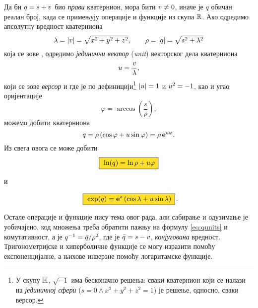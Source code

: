 Да би $q=s+{v}$ био {\sl прави\/} кватернион, мора бити ${v}\ne0$, иначе је $q$ обичан реалан број,
када се примењују операције и функције из скупа ${\mathbb R}$.
Ако одредимо апсолутну вредност кватерниона
$$
\lambda = {\vert{v}\vert} = \sqrt{\mathstrut x^2+y^2+z^2},\qquad
\rho = {\vert q\vert} = \sqrt{\mathstrut s^2+\lambda^2}
$$
која се зове {\sl {}\/}, одредимо
{\sl јединични вектор\/} ({\sl unit\/}) векторског дела кватерниона
$$
{u} = \frac {{v}}\lambda, 
$$
који се зове {\sl версор\/}
и где је по дефиницији\footnote{У 
скупу ${\mathbb H}$, $\sqrt{-1}$ има бесконачно решења:
сваки кватернион који се налази на {\sl јединичној сфери\/}
($s=0\land x^2+y^2+z^2=1$) је решење, односно, сваки версор.} 
${\vert{u}\vert}=1$ и  ${u}^2=-1$,
као и угао оријентације
$$
\varphi = \arccos\left( \frac s\rho \right),
$$
можемо добити  кватерниона
\begin{equation}
q
=\rho\,(\cos\varphi + {u}\sin\varphi)
=\rho\,{\bf e}^{{u}\varphi}.
\end{equation}
Из свега овога се може добити
\begin{equation}\index{ln@$\ln$}
    \okvir{\ln(q)  = \ln\rho + \uv\varphi}
\end{equation}
\centerline{и}
\begin{equation}\index{exp@$\exp$}
    \okvir{\exp(q) = \e^s \left( \cos\lambda + \uv\sin\lambda \right)}\rlap{.}
\end{equation}

\medskip

\danger
Остале операције и функције нису тема овог рада, али сабирање и одузимање
је уобичајено, код множења треба обратити пажњу на формулу \eqref{eq:qunits} и
комутативност, а  је
$q^{-1}={\bar q}/\rho^2$, где је ${\bar q}=s-{v}$, {\sl конјугована\/} вредност. 
Тригонометријске и хиперболичне функције се могу изразити помоћу експоненцијалне,
а њихове инверзне помоћу логаритамске функције.

